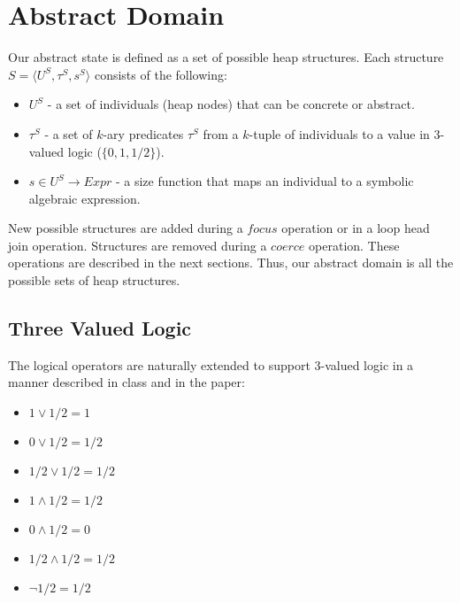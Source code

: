 \section*{Abstract Domain}
Our abstract state is defined as a set of possible heap structures. Each structure $S = \langle U^S,\tau^S,s^S\rangle$ consists of the following:
\begin{itemize}
	\item $U^S$ - a set of individuals (heap nodes) that can be concrete or abstract.
	\item $\tau^S$ - a set of $k$-ary predicates $\tau^S$ from a $k$-tuple of individuals to a value in 3-valued logic ($\{0,1,1/2\}$).
	\item $s\in U^S\to Expr$ - a size function that maps an individual to a symbolic algebraic expression.

\end{itemize}
New possible structures are added during a $focus$ operation or in a loop head join operation. Structures are removed during a $coerce$ operation. These operations are described in the next sections. Thus, our abstract domain is all the possible sets of heap structures.

\subsection*{Three Valued Logic}
The logical operators are naturally extended to support 3-valued logic in a manner described in class and in the paper:
\begin{itemize}
	\item $1 \lor 1/2 = 1$
	\item $0 \lor 1/2 = 1/2$
	\item $1/2 \lor 1/2 = 1/2$
	\item $1 \land 1/2 = 1/2$
	\item $0 \land 1/2 = 0$
	\item $1/2 \land 1/2 = 1/2$
	\item $\neg 1/2 = 1/2$
\end{itemize}

